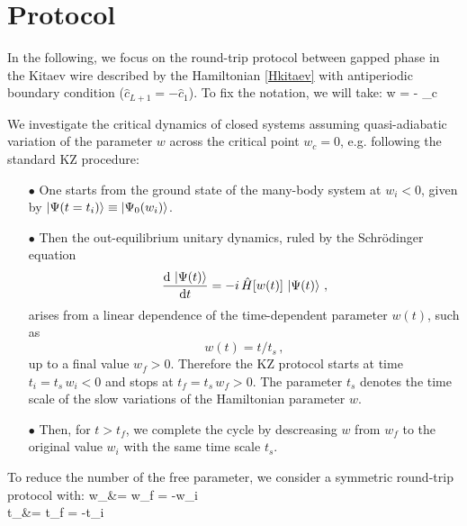 
\section{Protocol}

 In the following, we focus on the round-trip protocol between gapped phase in the Kitaev
wire described by the Hamiltonian \eqref{Hkitaev} with antiperiodic boundary condition
($\hat c_{L+1} = - \hat c_1$). To fix the notation, we will take:
	w = \mu - \mu_c \pt
\ee

We investigate the critical dynamics of closed systems assuming quasi-adiabatic variation
of the parameter $w$ across the critical point $w_c = 0$, e.g. following the standard KZ
procedure:

\begin{itemize}
\item[$\bullet$] One starts from the ground state of the many-body system at
	$w_i < 0$, given by $\ket{\Psi(t=t_i)} \equiv \ket{\Psi_0(w_i)}$.
  
\item[$\bullet$] Then the out-equilibrium unitary dynamics, ruled by the
	Schr\"odinger equation
	\begin{equation}
		{{\rm d} \, \ket{\Psi(t)} \over {\rm d} t} =
		- i \, \hat H[w(t)] \, \ket{\Psi(t)} \,,
	\label{unitdyn}
	\end{equation}
	arises from a linear dependence of the time-dependent parameter $w(t)$, such as
	\begin{equation}
		w(t) = t/t_s \,,
		\label{wtkz}
	\end{equation}
	up to a final value $w_f>0$. Therefore the KZ protocol starts at time 
	$t_i = t_s \, w_i<0$ and stops at $t_f= t_s \, w_f>0$.  The
	parameter $t_s$ denotes the time scale of the slow variations of the
	Hamiltonian parameter $w$.

\item[$\bullet$]
	Then, for $t>t_f$, we complete the cycle by descreasing $w$ from $w_f$ to the
	original value $w_i$ with the same time scale $t_s$.

\end{itemize}

To reduce the number of the free parameter, we consider a symmetric round-trip protocol
with:
	w_\star &= w_f = -w_i \cm \\
	t_\star &= t_f = -t_i \pt
\ea

